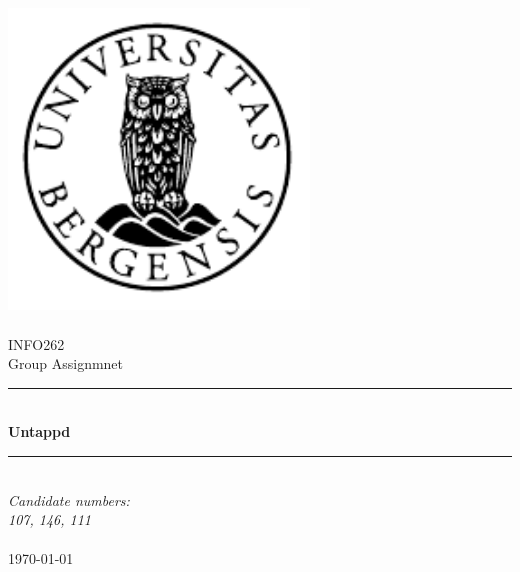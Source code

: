 \documentclass[12pt]{article}
\renewcommand{\maketitle}{}
\begin{document}
\maketitle

\newcommand{\blankpage}{\newpage{}\thispagestyle{empty}\mbox{}\newpage{}}
\newcommand{\HRule}{\rule{\linewidth}{0.5mm}}

\begin{titlepage}
\begin{center}
\includegraphics[width=8cm]{pictures/uib-emblem-svart} \\[0.5cm]
\paragraph*{}

\textsc{\Large INFO262 }\\[0.5cm]
\Large Group Assignmnet\\[0.4cm]
\HRule \\[0.4cm]
{\huge \bfseries Untappd}\\[0.5cm]
\HRule \\[1.0cm]

\emph{Candidate numbers:\\
      107, 146, 111}\\

\paragraph*{}
\end{center}
\vfill
\begin{center}
{\large \today}
\end{center}
\end{titlepage}

\setcounter{tocdepth}{3}
\tableofcontents
\end{document}
